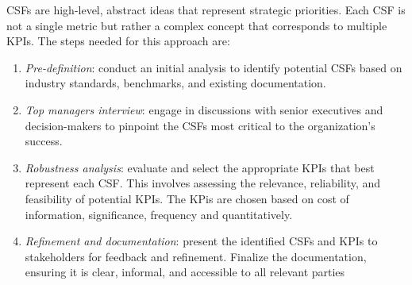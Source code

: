 CSFs are high-level, abstract ideas that represent strategic priorities.
Each CSF is not a single metric but rather a complex concept that corresponds to multiple KPIs. 
The steps needed for this approach are:
\begin{enumerate}
    \item \textit{Pre-definition}: conduct an initial analysis to identify potential CSFs based on industry standards, benchmarks, and existing documentation.
    \item \textit{Top managers interview}: engage in discussions with senior executives and decision-makers to pinpoint the CSFs most critical to the organization's success.
    \item \textit{Robustness analysis}: evaluate and select the appropriate KPIs that best represent each CSF. 
        This involves assessing the relevance, reliability, and feasibility of potential KPIs.
        The KPis are chosen based on cost of information, significance, frequency and quantitatively.
    \item \textit{Refinement and documentation}: present the identified CSFs and KPIs to stakeholders for feedback and refinement.
        Finalize the documentation, ensuring it is clear, informal, and accessible to all relevant parties
\end{enumerate}